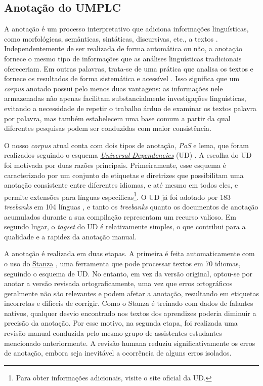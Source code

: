 \documentclass[portuguese]{textolivre}
\begin{document}
\subsection{Anotação do UMPLC}

A anotação é um processo interpretativo que adiciona informações linguísticas, como morfológicas, semânticas, sintáticas, discursivas, etc., a textos \cite[2]{garside1997corpus}. Independentemente de ser realizada de forma automática ou não, a anotação fornece o mesmo tipo de informações que as análises linguísticas tradicionais ofereceriam. Em outras palavras, trata-se de uma prática que analisa os textos e fornece os resultados de forma sistemática e acessível \cite[13]{mcenery2011corpus}. Isso significa que um \textit{corpus} anotado possui pelo menos duas vantagens: as informações nele armazenadas não apenas facilitam substancialmente investigações linguísticas, evitando a necessidade de repetir o trabalho árduo de examinar os textos palavra por palavra, mas também estabelecem uma base comum a partir da qual diferentes pesquisas podem ser conduzidas com maior consistência.

O nosso \textit{corpus} atual conta com dois tipos de anotação, \textit{PoS} e lema, que foram realizados seguindo o esquema \href{https://universaldependencies.org}{\textit{Universal Dependencies}} (UD) \cite{de-marneffe-etal-2021-universal}. A escolha do UD foi motivada por duas razões principais. Primeiramente, esse esquema é caracterizado por um conjunto de etiquetas e diretrizes que possibilitam uma anotação consistente entre diferentes idiomas, e até mesmo em todos eles, e permite extensões para línguas específicas\footnote{Para obter informações adicionais, visite o site oficial da UD.}. O UD já foi adotado por 183 \textit{treebanks} em 104 línguas \cite[256]{de-marneffe-etal-2021-universal}, e tanto os \textit{treebanks} quanto os documentos de anotação acumulados durante a sua compilação representam um recurso valioso. Em segundo lugar, o \textit{tagset} do UD é relativamente simples, o que contribui para a qualidade e a rapidez da anotação manual.

A anotação é realizada em duas etapas. A primeira é feita automaticamente com o uso do \href{https://stanfordnlp.github.io/stanza}{Stanza} \cite{qi2020stanza}, uma ferramenta que pode processar textos em 70 idiomas, seguindo o esquema de UD. No entanto, em vez da versão original, optou-se por anotar a versão revisada ortograficamente, uma vez que erros ortográficos geralmente não são relevantes e podem afetar a anotação, resultando em etiquetas incorretas e difíceis de corrigir. Como o Stanza é treinado com dados de falantes nativos, qualquer desvio encontrado nos textos dos aprendizes poderia diminuir a precisão da anotação. Por esse motivo, na segunda etapa, foi realizada uma revisão manual conduzida pelo mesmo grupo de assistentes estudantes mencionado anteriormente. A revisão humana reduziu significativamente os erros de anotação, embora seja inevitável a ocorrência de alguns erros isolados.
\end{document}
